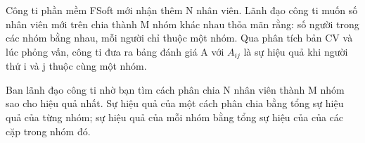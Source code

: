 Công ti phần mềm FSoft mới nhận thêm N nhân viên. Lãnh đạo công ti muốn số nhân viên mới trên chia thành M nhóm khác nhau thỏa mãn rằng: số người trong các nhóm bằng nhau, mỗi người chỉ thuộc một nhóm. Qua phân tích bản CV và lúc phỏng vấn, công ti đưa ra bảng đánh giá A với $A_{ij}$   là sự hiệu quả khi người thứ i và j thuộc cùng một nhóm.   


   Ban lãnh đạo công ti nhờ bạn tìm cách phân chia N nhân viên thành M nhóm sao cho hiệu quả nhất. Sự hiệu quả của một cách phân chia bằng tổng sự hiệu quả của từng nhóm; sự hiệu quả của mỗi nhóm bằng tổng sự hiệu của của các cặp trong nhóm đó.